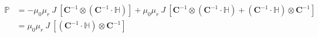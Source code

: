 \documentclass[11pt,a4paper,final]{article}
\begin{document}
\newline
\begin{align*}
\mathbb{P} &= - \mu_0 \mu_r \ J \ \left[  \mathbf{C}^{-1} \otimes (\mathbf{C}^{-1} \cdot \mathbb{H}) \right] +  \mu_0 \mu_r \ J \ \left[ \mathbf{C}^{-1} \otimes (\mathbf{C}^{-1} \cdot \mathbb{H}) + (\mathbf{C}^{-1} \cdot \mathbb{H}) \otimes \mathbf{C}^{-1} \right]\\
&= \mu_0 \mu_r \ J \ \left[ (\mathbf{C}^{-1} \cdot \mathbb{H}) \otimes \mathbf{C}^{-1} \right]
\end{align*}

\newpage
\printbibliography
\end{document}
